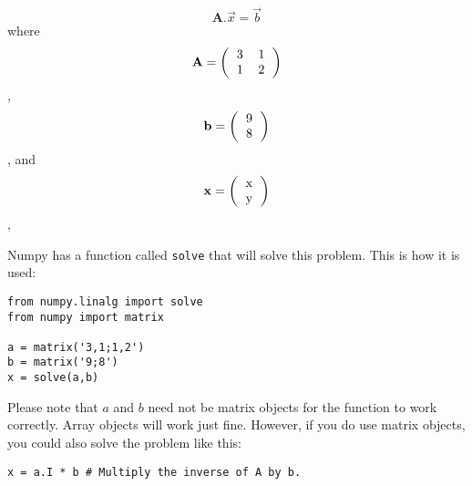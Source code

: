 \begin{equation}
\mathbf{A}.\vec{x} = \vec{b}
\end{equation}
where
\begin{equation}
\mathbf{A} = \left( \begin{tabular}{cc}
3 & 1 \\
1 & 2 \\
\end{tabular}
\right)
\end{equation},
\begin{equation}
\vec{b} = \left( \begin{tabular}{c}
9  \\
8  \\
\end{tabular}
\right)
\end{equation}, 
and
\begin{equation}
\vec{x} = \left( \begin{tabular}{c}
x  \\
y  \\
\end{tabular}
\right)
\end{equation}, 

Numpy has a function called \texttt{solve} that will solve this
problem.  This is how it is used:
\begin{Verbatim}
from numpy.linalg import solve
from numpy import matrix

a = matrix('3,1;1,2')
b = matrix('9;8')
x = solve(a,b)
\end{Verbatim}
Please note that $a$ and $b$ need not be matrix objects for the
 function to work correctly.  Array objects will work just
fine.  However, if you do use matrix objects, you could also solve the
problem like this:
\begin{Verbatim}
x = a.I * b # Multiply the inverse of A by b.
\end{Verbatim}


